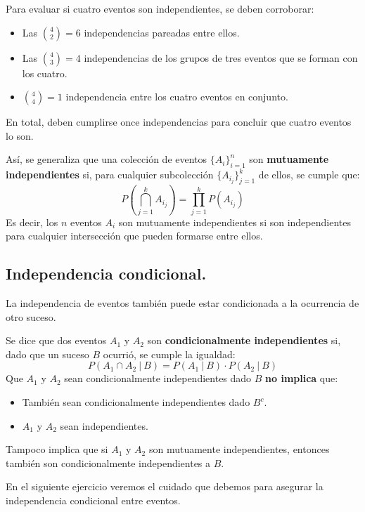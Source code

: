 \documentclass[12pt]{article}
\begin{document}
Para evaluar si cuatro eventos son independientes, se deben corroborar:

\begin{itemize}
\item Las $\binom{4}{2} = 6$ independencias pareadas entre ellos.
\item Las $\binom{4}{3} = 4$ independencias de los grupos de tres eventos que se forman con los cuatro.
\item $\binom{4}{4} = 1$ independencia entre los cuatro eventos en conjunto.
\end{itemize}

En total, deben cumplirse once independencias para concluir que cuatro eventos lo son.

Así, se generaliza que una colección de eventos $\{A_{i}\}_{i = 1}^{n}$ son \textbf{mutuamente independientes} si, para cualquier subcolección $\{A_{i_{j}}\}_{j = 1}^{k}$ de ellos, se cumple que:
\[
  P\left(\bigcap_{j = 1}^{k} A_{i_{j}}\right) = \prod_{j = 1}^{k} P(A_{i_{j}})
\]
Es decir, los $n$ eventos $A_{i}$ son mutuamente independientes si son independientes para cualquier intersección que pueden formarse entre ellos.

\subsection{Independencia condicional.}

La independencia de eventos también puede estar condicionada a la ocurrencia de otro suceso.

Se dice que dos eventos $A_{1}$ y $A_{2}$ son \textbf{condicionalmente independientes} si, dado que un suceso $B$ ocurrió, se cumple la igualdad:
\[
  P(A_{1} \cap A_{2} \ | \ B) = P(A_{1} \ | \ B) \cdot P(A_{2} \ | \ B)
\]
Que $A_{1}$ y $A_{2}$ sean condicionalmente independientes dado $B$ \textbf{no implica} que:

\begin{itemize}
\item También sean condicionalmente independientes dado $B^{c}$.
\item $A_{1}$ y $A_{2}$ sean independientes.
\end{itemize}

Tampoco implica que si $A_{1}$ y $A_{2}$ son mutuamente independientes, entonces también son condicionalmente independientes a $B$.

En el siguiente ejercicio veremos el cuidado que debemos para asegurar la independencia condicional entre eventos.
\end{document}

